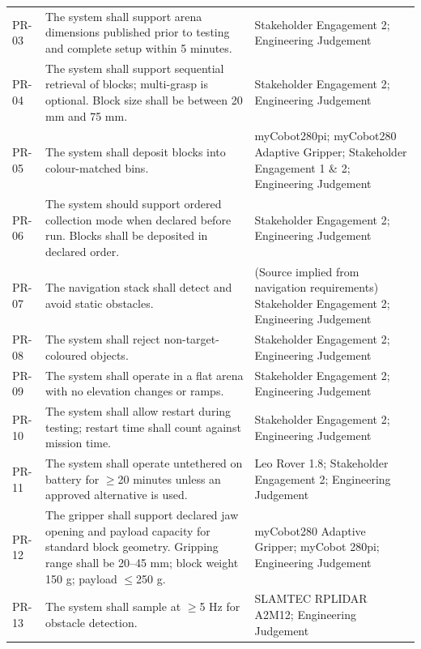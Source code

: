 \begin{landscape}
\begin{longtable}{@{}R{1.2cm} R{15.8cm} R{7.5cm}@{}}
PR-03 & The system shall support arena dimensions published prior to testing and complete setup within 5 minutes. & Stakeholder Engagement 2; Engineering Judgement \\[6pt]

PR-04 & The system shall support sequential retrieval of blocks; multi-grasp is optional. Block size shall be between 20 mm and 75 mm. & Stakeholder Engagement 2; Engineering Judgement \\[6pt]

PR-05 & The system shall deposit blocks into colour-matched bins. & myCobot280pi; myCobot280 Adaptive Gripper; Stakeholder Engagement 1 \& 2; Engineering Judgement \\[6pt]

PR-06 & The system should support ordered collection mode when declared before run. Blocks shall be deposited in declared order. & Stakeholder Engagement 2; Engineering Judgement \\[6pt]

PR-07 & The navigation stack shall detect and avoid static obstacles. & (Source implied from navigation requirements) Stakeholder Engagement 2; Engineering Judgement \\[6pt]

PR-08 & The system shall reject non-target-coloured objects. & Stakeholder Engagement 2; Engineering Judgement \\[6pt]

PR-09 & The system shall operate in a flat arena with no elevation changes or ramps. & Stakeholder Engagement 2; Engineering Judgement \\[6pt]

PR-10 & The system shall allow restart during testing; restart time shall count against mission time. & Stakeholder Engagement 2; Engineering Judgement \\[6pt]

PR-11 & The system shall operate untethered on battery for $\geq$20 minutes unless an approved alternative is used. & Leo Rover 1.8; Stakeholder Engagement 2; Engineering Judgement \\[6pt]

PR-12 & The gripper shall support declared jaw opening and payload capacity for standard block geometry. Gripping range shall be 20--45 mm; block weight 150 g; payload $\leq$250 g. & myCobot280 Adaptive Gripper; myCobot 280pi; Engineering Judgement \\[6pt]

PR-13 & The system shall sample at $\geq$5 Hz for obstacle detection. & SLAMTEC RPLIDAR A2M12; Engineering Judgement \\[6pt]


\end{longtable}
\end{landscape}
